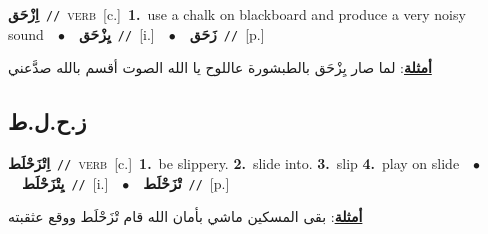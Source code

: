 \documentclass[10pt,a4paper,twoside]{article} %
\begin{document}
\begin{multicols}{2}
{{{{{{{{{\setlength\topsep{0pt}\textbf{\foreignlanguage{arabic}{اِزْحَق}}\ {\color{gray}\texttt{//}\color{black}}\ \textsc{verb}\ [c.]\ \textbf{1.}~use a chalk on blackboard and produce a very noisy sound\ \ $\bullet$\ \ \setlength\topsep{0pt}\textbf{\foreignlanguage{arabic}{يِزْحَق}}\ {\color{gray}\texttt{//}\color{black}}\ [i.]\ \ $\bullet$\ \ \setlength\topsep{0pt}\textbf{\foreignlanguage{arabic}{زَحَق}}\ {\color{gray}\texttt{//}\color{black}}\ [p.]\  \begin{flushright}\color{gray}\foreignlanguage{arabic}{\textbf{\underline{\foreignlanguage{arabic}{أمثلة}}}: لما صار يِزْحَق بالطبشورة عاللوح يا الله الصوت أقسم بالله صدَّعني}\end{flushright}\color{black}} \vspace{2mm}

\vspace{-3mm}
\subsection*{\color{blue}\foreignlanguage{arabic}{ز.ح.ل.ط}\color{blue}{}} 

{\setlength\topsep{0pt}\textbf{\foreignlanguage{arabic}{اِتْزَحْلَط}}\ {\color{gray}\texttt{//}\color{black}}\ \textsc{verb}\ [c.]\ \textbf{1.}~be slippery.  \textbf{2.}~slide into.  \textbf{3.}~slip  \textbf{4.}~play on slide\ \ $\bullet$\ \ \setlength\topsep{0pt}\textbf{\foreignlanguage{arabic}{يِتْزَحْلَط}}\ {\color{gray}\texttt{//}\color{black}}\ [i.]\ \ $\bullet$\ \ \setlength\topsep{0pt}\textbf{\foreignlanguage{arabic}{تْزَحْلَط}}\ {\color{gray}\texttt{//}\color{black}}\ [p.]\  \begin{flushright}\color{gray}\foreignlanguage{arabic}{\textbf{\underline{\foreignlanguage{arabic}{أمثلة}}}: بقى المسكين ماشي بأمان الله قام تْزَحْلَط ووقع عثقبته}\end{flushright}\color{black}} \vspace{2mm}

}}}}}}}}
\end{multicols}
\end{document}
